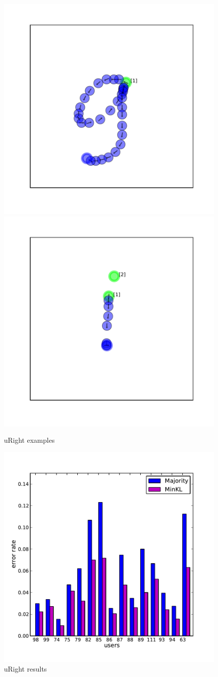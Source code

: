 \documentclass{article}
\begin{document}
\begin{figure}[ht]
\vskip 0.2in
\begin{center}
\centering
  \includegraphics[width=.3\linewidth]{figures/icml-uright-examples-0.pdf}
  \includegraphics[width=.3\linewidth]{figures/icml-uright-examples-1.pdf}\\
  \caption{uRight examples}
  \label{fig:uright-examples}
\end{center}
\vskip -0.2in
\end{figure}

\begin{figure}[ht]
\vskip 0.2in
\begin{center}
\centering
  \includegraphics[width=.95\linewidth]{figures/icml-uright-allusers.pdf}
  \caption{uRight results}
  \label{fig:uright-results}
\end{center}
\vskip -0.2in
\end{figure}
\end{document}

